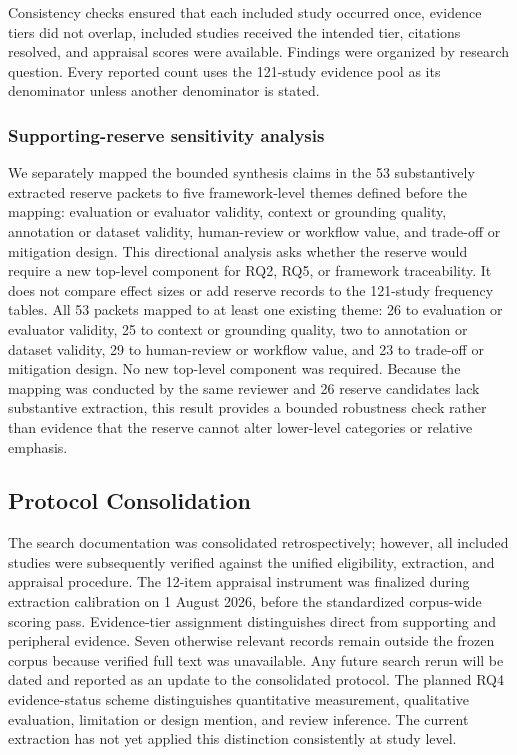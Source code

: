 \documentclass[10pt]{article}
\begin{document}
Consistency checks ensured that each included study occurred once, evidence tiers did not overlap, included studies received the intended tier, citations resolved, and appraisal scores were available. Findings were organized by research question. Every reported count uses the 121-study evidence pool as its denominator unless another denominator is stated.

\subsubsection{Supporting-reserve sensitivity analysis}

We separately mapped the bounded synthesis claims in the 53 substantively extracted reserve packets to five framework-level themes defined before the mapping: evaluation or evaluator validity, context or grounding quality, annotation or dataset validity, human-review or workflow value, and trade-off or mitigation design. This directional analysis asks whether the reserve would require a new top-level component for RQ2, RQ5, or framework traceability. It does not compare effect sizes or add reserve records to the 121-study frequency tables. All 53 packets mapped to at least one existing theme: 26 to evaluation or evaluator validity, 25 to context or grounding quality, two to annotation or dataset validity, 29 to human-review or workflow value, and 23 to trade-off or mitigation design. No new top-level component was required. Because the mapping was conducted by the same reviewer and 26 reserve candidates lack substantive extraction, this result provides a bounded robustness check rather than evidence that the reserve cannot alter lower-level categories or relative emphasis.

\subsection{Protocol Consolidation}

The search documentation was consolidated retrospectively; however, all included studies were subsequently verified against the unified eligibility, extraction, and appraisal procedure. The 12-item appraisal instrument was finalized during extraction calibration on 1 August 2026, before the standardized corpus-wide scoring pass. Evidence-tier assignment distinguishes direct from supporting and peripheral evidence. Seven otherwise relevant records remain outside the frozen corpus because verified full text was unavailable. Any future search rerun will be dated and reported as an update to the consolidated protocol. The planned RQ4 evidence-status scheme distinguishes quantitative measurement, qualitative evaluation, limitation or design mention, and review inference. The current extraction has not yet applied this distinction consistently at study level.
\end{document}
